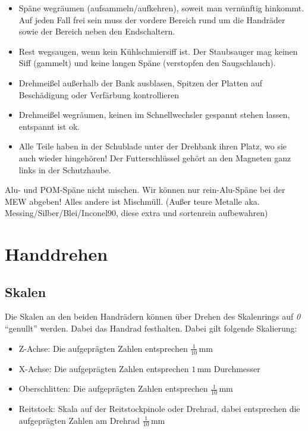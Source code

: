 \documentclass{\basedir/fablab-document}
\begin{document}
\begin{itemize}
 \item Späne wegräumen (aufsammeln/aufkehren), soweit man vernünftig hinkommt. Auf jeden Fall frei sein muss der vordere Bereich rund um die Handräder sowie der Bereich neben den Endschaltern.
 \item Rest wegsaugen, wenn kein Kühlschmiersiff ist. Der Staubsauger mag keinen Siff (gammelt) und keine langen Späne (verstopfen den Saugschlauch).
 \item Drehmeißel außerhalb der Bank ausblasen, Spitzen der Platten auf Beschädigung oder Verfärbung kontrollieren
 \item Drehmeißel wegräumen, keinen im Schnellwechsler gespannt stehen lassen, entspannt ist ok.
 \item Alle Teile haben in der Schublade unter der Drehbank ihren Platz, wo sie auch wieder hingehören! Der Futterschlüssel gehört an den Magneten ganz links in der Schutzhaube.
\end{itemize}


Alu- und POM-Späne nicht mischen. Wir können nur rein-Alu-Späne bei der MEW abgeben! Alles andere ist Mischmüll. (Außer teure Metalle aka. Messing/Silber/Blei/Inconel90, diese extra und sortenrein aufbewahren)




\newpage
\section{Handdrehen}
\label{handdrehen}
\subsection{Skalen}

Die Skalen an den beiden Handrädern können über Drehen des Skalenrings auf \emph{0} \enquote{genullt} werden.
Dabei das Handrad festhalten.
Dabei gilt folgende Skalierung:
\begin{itemize}
\item Z-Achse: Die aufgeprägten Zahlen entsprechen $\frac{1}{10}$\,mm 
\item X-Achse: Die aufgeprägten Zahlen entsprechen $1$\,mm Durchmesser
\item Oberschlitten: Die aufgeprägten Zahlen entsprechen $\frac{1}{10}$\,mm 
\item Reitstock: Skala auf der Reitstockpinole oder Drehrad, dabei entsprechen die aufgeprägten Zahlen am Drehrad $\frac{1}{10}$\,mm
\end{itemize}
\end{document}
